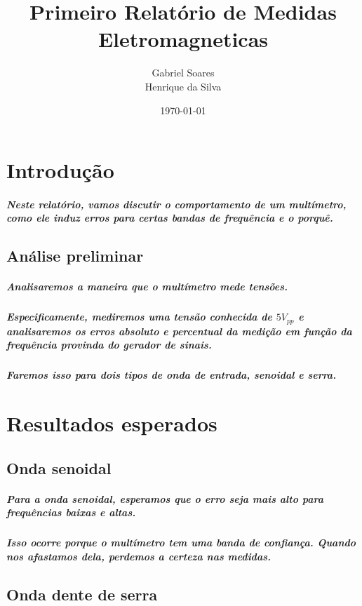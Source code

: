 \documentclass[12pt,twoside, a4paper, twocolumn]{article}
\title{Primeiro Relatório de Medidas Eletromagneticas}
\author{Gabriel Soares \\ Henrique da Silva}
\date{\today}
\begin{document}
\maketitle
{}
\newpage
\tableofcontents
\newpage



\section{Introdução}


\subparagraph*{Neste relatório, vamos discutir o comportamento de um multímetro, como ele induz erros para certas bandas de frequência e o porquê.}





\subsection{Análise preliminar}

\subparagraph*{Analisaremos a maneira que o multímetro mede tensões.}

\subparagraph*{Especificamente, mediremos uma tensão conhecida de $5 V_{pp}$ e analisaremos os erros absoluto e percentual da medição em função da frequência provinda do gerador de sinais.}

\subparagraph*{Faremos isso para dois tipos de onda de entrada, senoidal e serra.}

\section{Resultados esperados}

\subsection{Onda senoidal}

\subparagraph*{Para a onda senoidal, esperamos que o erro seja mais alto para frequências baixas e altas.}

\subparagraph*{Isso ocorre porque o multímetro tem uma banda de confiança. Quando nos afastamos dela, perdemos a certeza nas medidas.}

\subsection{Onda dente de serra}
\end{document}
